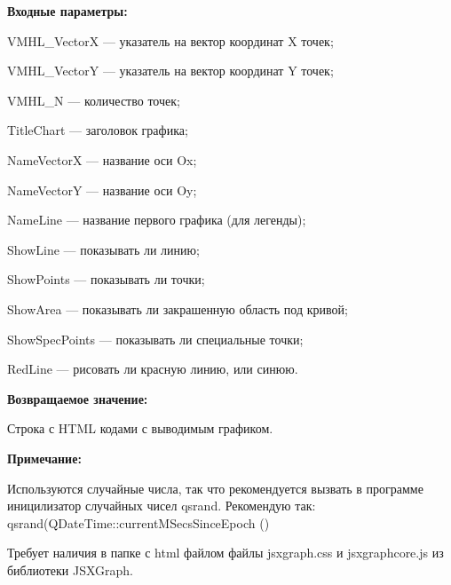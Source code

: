 \textbf{Входные параметры:}
 
    VMHL\_VectorX --- указатель на вектор координат X точек;
 
    VMHL\_VectorY --- указатель на вектор координат Y точек;
 
    VMHL\_N --- количество точек;
 
    TitleChart --- заголовок графика;
 
    NameVectorX --- название оси Ox;
 
    NameVectorY --- название оси Oy;
 
    NameLine --- название первого графика (для легенды);
 
    ShowLine --- показывать ли линию;
 
    ShowPoints --- показывать ли точки;
 
    ShowArea --- показывать ли закрашенную область под кривой;
 
    ShowSpecPoints --- показывать ли специальные точки;
 
    RedLine --- рисовать ли красную линию, или синюю.

\textbf{Возвращаемое значение:}

Строка с HTML кодами с выводимым графиком.

\textbf{Примечание:}

Используются случайные числа, так что рекомендуется вызвать в программе иницилизатор случайных чисел qsrand. Рекомендую так: qsrand(QDateTime::currentMSecsSinceEpoch () %

Требует наличия в папке с html файлом файлы jsxgraph.css и jsxgraphcore.js из библиотеки JSXGraph.